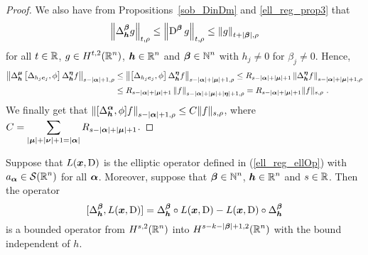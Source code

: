 \begin{proof}
We also have from Propositions~\ref{sob_DinDm} and \ref{ell_reg_prop3}
that
\begin{equation} \label{DeltaBoundOpEq4}
\left\| \Delta^{{\bm{\beta}}}_{{\bm{h}}} g \right\|_{t,\rho}
\leq \left\| \operatorname{D}^{{\bm{\beta}}} g \right\|_{t,\rho}
\leq \left\| g \right\|_{t+|{\bm{\beta}}|,\rho}
\end{equation}
for all $t\in \mathbb{R}$, $\displaystyle g \in H^{t,2}(\mathbb{R}^n)$,
$\displaystyle {\bm{h}} \in \mathbb{R}^n$ and
$\displaystyle {\bm{\beta}} \in \mathbb{N}^n$ with $h_j \neq 0$ for
$\beta_j \neq 0$.  Hence,
\begin{align*}
\left\| \Delta^{{\bm{\mu}}}_{{\bm{h}}} \left[
\Delta_{h_j {\bm{e}}_j}, \phi\right] \Delta^{{\bm{\eta}}}_{{\bm{h}}} f
\right\|_{s-|{\bm{\alpha}}|+1,\rho}
&\leq \left\| \left[ \Delta_{h_j {\bm{e}}_j}, \phi\right]
\Delta^{{\bm{\eta}}}_{{\bm{h}}}
f\right\|_{s-|{\bm{\alpha}}|+|{\bm{\mu}}|+1,\rho}
\leq R_{s-|{\bm{\alpha}}|+|{\bm{\mu}}|+1}
\left\| \Delta^{{\bm{\eta}}}_{{\bm{h}}} f
\right\|_{s-|{\bm{\alpha}}|+|{\bm{\mu}}|+1,\rho} \\
& \leq R_{s-|{\bm{\alpha}}|+|{\bm{\mu}}|+1}
\left\| f \right\|_{s-|{\bm{\alpha}}|+|{\bm{\mu}}|+|{\bm{\eta}}|+1,\rho}
= R_{s-|{\bm{\alpha}}|+|{\bm{\mu}}|+1} \|f\|_{s,\rho} \ .
\end{align*}
We finally get that
$\displaystyle 
\left\| [\Delta^{{\bm{\alpha}}}_{{\bm{h}}}, \phi] f \right\|_{s-|{\bm{\alpha}}|+1,\rho}
\leq C \|f\|_{s,\rho}$, where
$\displaystyle C = \sum_{|{\bm{\mu}}|+|{\bm{\nu}}|+1 = |{\bm{\alpha}}|}
R_{s-|{\bm{\alpha}}|+|{\bm{\mu}}|+1}$.
\end{proof}

\begin{cor} \label{ell_reg_cor1}
Suppose that $L({\bm{x}},\operatorname{D})$ is the elliptic operator defined
in (\ref{ell_reg_ellOp}) with $\displaystyle a_{{\bm{\alpha}}} \in \mathcal{S}(\mathbb{R}^n)$
for all ${\bm{\alpha}}$.  Moreover, suppose that
$\displaystyle {\bm{\beta}} \in \mathbb{N}^n$, $\displaystyle {\bm{h}}\in \mathbb{R}^n$ and
$s \in \mathbb{R}$.  Then the operator
\[
[\Delta^{{\bm{\beta}}}_{{\bm{h}}}, L({\bm{x}},\operatorname{D})]
= \Delta^{{\bm{\beta}}}_{{\bm{h}}} \circ L({\bm{x}},\operatorname{D}) - L({\bm{x}},\operatorname{D})
\circ \Delta^{{\bm{\beta}}}_{{\bm{h}}}
\]
is a bounded operator from $\displaystyle H^{s,2}(\mathbb{R}^n)$ into
$\displaystyle H^{s-k-|{\bm{\beta}}|+1,2}(\mathbb{R}^n)$ with the bound
independent of $h$.
\end{cor}


